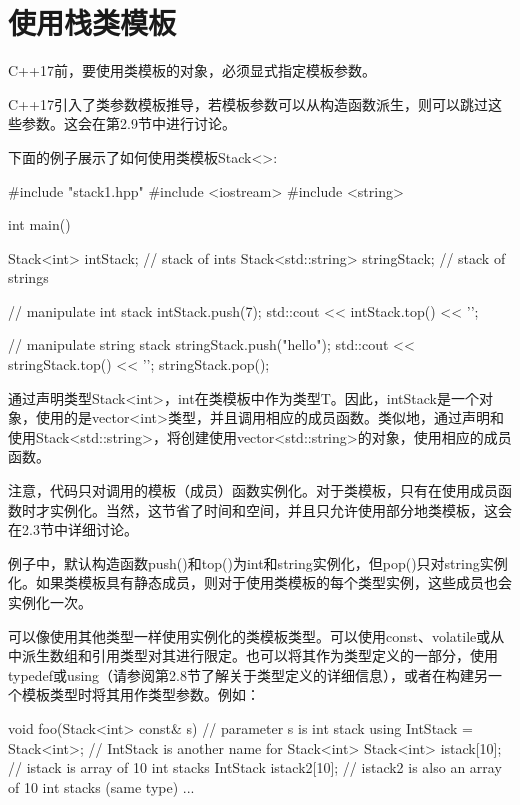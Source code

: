 \section{使用栈类模板}

C++17前，要使用类模板的对象，必须显式指定模板参数。

\begin{notice}
C++17引入了类参数模板推导，若模板参数可以从构造函数派生，则可以跳过这些参数。这会在第2.9节中进行讨论。
\end{notice}

下面的例子展示了如何使用类模板Stack<>:

\begin{cpp}
#include "stack1.hpp"
#include <iostream>
#include <string>

int main() {
	Stack<int> intStack; // stack of ints
	Stack<std::string> stringStack; // stack of strings
	
	// manipulate int stack
	intStack.push(7);
	std::cout << intStack.top() << '\n';
	
	// manipulate string stack
	stringStack.push("hello");
	std::cout << stringStack.top() << '\n';
	stringStack.pop();
}
\end{cpp}

通过声明类型Stack<int>，int在类模板中作为类型T。因此，intStack是一个对象，使用的是vector<int>类型，并且调用相应的成员函数。类似地，通过声明和使用Stack<std::string>，将创建使用vector<std::string>的对象，使用相应的成员函数。

注意，代码只对调用的模板（成员）函数实例化。对于类模板，只有在使用成员函数时才实例化。当然，这节省了时间和空间，并且只允许使用部分地类模板，这会在2.3节中详细讨论。

例子中，默认构造函数push()和top()为int和string实例化，但pop()只对string实例化。如果类模板具有静态成员，则对于使用类模板的每个类型实例，这些成员也会实例化一次。

可以像使用其他类型一样使用实例化的类模板类型。可以使用const、volatile或从中派生数组和引用类型对其进行限定。也可以将其作为类型定义的一部分，使用typedef或using（请参阅第2.8节了解关于类型定义的详细信息），或者在构建另一个模板类型时将其用作类型参数。例如：

\begin{cpp}
void foo(Stack<int> const& s) { // parameter s is int stack
	using IntStack = Stack<int>; // IntStack is another name for Stack<int>
	Stack<int> istack[10]; // istack is array of 10 int stacks
	IntStack istack2[10]; // istack2 is also an array of 10 int stacks (same type)
	...
}
\end{cpp}

